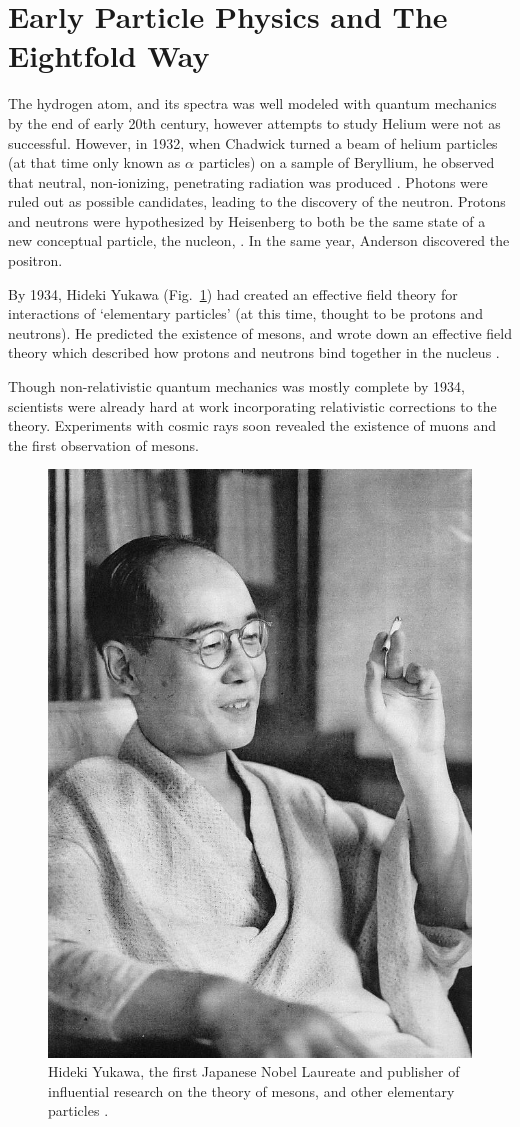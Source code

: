 \clearpage
\section{Early Particle Physics and The Eightfold Way}

The hydrogen atom, and its spectra was well modeled with quantum mechanics by
the end of early 20th century, however attempts to study Helium were not as
successful. However, in 1932,  when Chadwick turned a beam of
helium particles (at that time only known as $\alpha$ particles) on a sample of
Beryllium, he observed that neutral, non-ionizing, penetrating radiation was
produced  \cite{Krauss2015}. Photons were ruled out as possible
candidates, leading to the discovery of the neutron. Protons and neutrons were
hypothesized by Heisenberg to both be the same state of a new conceptual
particle, the nucleon,  \cite{Heisenberg1952}. In the same year, Anderson
discovered the positron. 

By 1934, Hideki Yukawa (Fig.~\ref{fig:hidekiyukawa}) had created an effective
field theory for interactions of `elementary particles' (at this time, thought
to be protons and neutrons). He predicted the existence of mesons, and wrote
down an effective field theory which described how protons and neutrons bind
together in the nucleus \cite{Yukawa1935}. 

Though non-relativistic quantum mechanics was mostly complete by 1934,
scientists were already hard at work incorporating relativistic corrections to
the theory. Experiments with cosmic rays soon revealed the existence of muons
and the first observation of mesons.

\begin{figure}[ht]
	\begin{center}
		\includegraphics[width=0.5\linewidth]{./figures/hidekiyukawa.jpg}
		\caption{
			Hideki Yukawa, the first Japanese Nobel Laureate and publisher of
			influential research on the theory of mesons, and other elementary
			particles  \cite{YukawaPhoto1952}.
		}
		\label{fig:hidekiyukawa}
	\end{center}
\end{figure}


